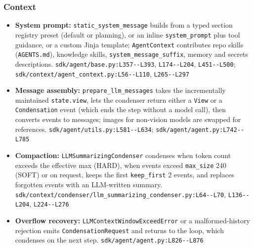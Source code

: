\subsubsection*{Context}
\begin{itemize}
\item \textbf{System prompt:} \texttt{static\_\allowbreak{}system\_\allowbreak{}message} builds from a typed section registry preset (default or planning), or an inline \texttt{system\_\allowbreak{}prompt} plus tool guidance, or a custom Jinja template; \texttt{AgentContext} contributes repo skills (\texttt{AGENTS.\allowbreak{}md}), knowledge skills, \texttt{system\_\allowbreak{}message\_\allowbreak{}suffix}, memory and secrets descriptions. \texttt{sdk/\allowbreak{}agent/\allowbreak{}base.\allowbreak{}py:\allowbreak{}L357-\allowbreak{}-\allowbreak{}L393}, \texttt{L174-\allowbreak{}-\allowbreak{}L204}, \texttt{L451-\allowbreak{}-\allowbreak{}L500}; \texttt{sdk/\allowbreak{}context/\allowbreak{}agent\_\allowbreak{}context.\allowbreak{}py:\allowbreak{}L56-\allowbreak{}-\allowbreak{}L110}, \texttt{L265-\allowbreak{}-\allowbreak{}L297}
\item \textbf{Message assembly:} \texttt{prepare\_\allowbreak{}llm\_\allowbreak{}messages} takes the incrementally maintained \texttt{state.\allowbreak{}view}, lets the condenser return either a \texttt{View} or a \texttt{Condensation} event (which ends the step without a model call), then converts events to messages; images for non-vision models are swapped for references. \texttt{sdk/\allowbreak{}agent/\allowbreak{}utils.\allowbreak{}py:\allowbreak{}L581-\allowbreak{}-\allowbreak{}L634}; \texttt{sdk/\allowbreak{}agent/\allowbreak{}agent.\allowbreak{}py:\allowbreak{}L742-\allowbreak{}-\allowbreak{}L785}
\item \textbf{Compaction:} \texttt{LLMSummarizingCondenser} condenses when token count exceeds the effective max (HARD), when events exceed \texttt{max\_\allowbreak{}size} 240 (SOFT) or on request, keeps the first \texttt{keep\_\allowbreak{}first} 2 events, and replaces forgotten events with an LLM-written summary. \texttt{sdk/\allowbreak{}context/\allowbreak{}condenser/\allowbreak{}llm\_\allowbreak{}summarizing\_\allowbreak{}condenser.\allowbreak{}py:\allowbreak{}L64-\allowbreak{}-\allowbreak{}L70}, \texttt{L136-\allowbreak{}-\allowbreak{}L204}, \texttt{L224-\allowbreak{}-\allowbreak{}L276}
\item \textbf{Overflow recovery:} \texttt{LLMContextWindowExceedError} or a malformed-history rejection emits \texttt{CondensationRequest} and returns to the loop, which condenses on the next step. \texttt{sdk/\allowbreak{}agent/\allowbreak{}agent.\allowbreak{}py:\allowbreak{}L826-\allowbreak{}-\allowbreak{}L876}

\end{itemize}
